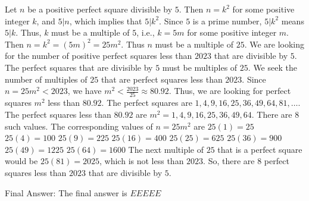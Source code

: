 \begin{paracol}{2}

\switchcolumn[0]
\begin{tcolorbox}[breakable, colframe=mydarkgreen!70, colback=mydarkgreen!10, title=Correct response]
Let $n$ be a positive perfect square divisible by $5$.
Then $n = k^2$ for some positive integer $k$, and $5 | n$, which implies that $5|k^2$.
Since $5$ is a prime number, $5|k^2$ means $5|k$.
Thus, $k$ must be a multiple of $5$, i.e., $k=5m$ for some positive integer $m$.
Then $n = k^2 = (5m)^2 = 25m^2$.
Thus $n$ must be a multiple of $25$.
We are looking for the number of positive perfect squares less than $2023$ that are divisible by $5$.
The perfect squares that are divisible by $5$ must be multiples of $25$.
We seek the number of multiples of $25$ that are perfect squares less than $2023$.
Since $n=25m^2 < 2023$, we have $m^2 < \frac{2023}{25} \approx 80.92$.
Thus, we are looking for perfect squares $m^2$ less than $80.92$.
The perfect squares are $1, 4, 9, 16, 25, 36, 49, 64, 81, \dots$.
The perfect squares less than $80.92$ are $m^2=1, 4, 9, 16, 25, 36, 49, 64$. There are $8$ such values.
The corresponding values of $n = 25m^2$ are
$25(1)=25$
$25(4)=100$
$25(9)=225$
$25(16)=400$
$25(25)=625$
$25(36)=900$
$25(49)=1225$
$25(64)=1600$
The next multiple of $25$ that is a perfect square would be $25(81)=2025$, which is not less than $2023$.
So, there are $8$ perfect squares less than $2023$ that are divisible by $5$.

Final Answer: The final answer is $\boxed{EEEEE}$
\end{tcolorbox}


\end{paracol}
